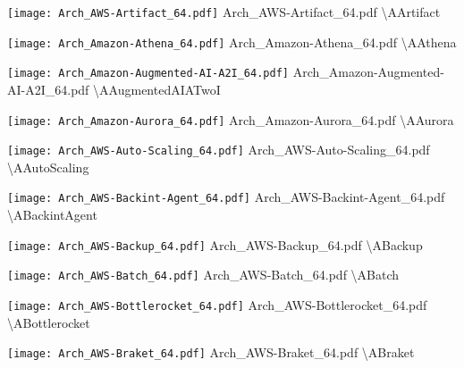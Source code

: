  {\texttt{[image: Arch\_AWS-Artifact\_64.pdf]}} {Arch\_AWS-Artifact\_64.pdf} {{\textbackslash}AArtifact}

 {\texttt{[image: Arch\_Amazon-Athena\_64.pdf]}} {Arch\_Amazon-Athena\_64.pdf} {{\textbackslash}AAthena}

 {\texttt{[image: Arch\_Amazon-Augmented-AI-A2I\_64.pdf]}} {Arch\_Amazon-Augmented-AI-A2I\_64.pdf} {{\textbackslash}AAugmentedAIATwoI}

 {\texttt{[image: Arch\_Amazon-Aurora\_64.pdf]}} {Arch\_Amazon-Aurora\_64.pdf} {{\textbackslash}AAurora}

 {\texttt{[image: Arch\_AWS-Auto-Scaling\_64.pdf]}} {Arch\_AWS-Auto-Scaling\_64.pdf} {{\textbackslash}AAutoScaling}

 {\texttt{[image: Arch\_AWS-Backint-Agent\_64.pdf]}} {Arch\_AWS-Backint-Agent\_64.pdf} {{\textbackslash}ABackintAgent}

 {\texttt{[image: Arch\_AWS-Backup\_64.pdf]}} {Arch\_AWS-Backup\_64.pdf} {{\textbackslash}ABackup}

 {\texttt{[image: Arch\_AWS-Batch\_64.pdf]}} {Arch\_AWS-Batch\_64.pdf} {{\textbackslash}ABatch}

 {\texttt{[image: Arch\_AWS-Bottlerocket\_64.pdf]}} {Arch\_AWS-Bottlerocket\_64.pdf} {{\textbackslash}ABottlerocket}

 {\texttt{[image: Arch\_AWS-Braket\_64.pdf]}} {Arch\_AWS-Braket\_64.pdf} {{\textbackslash}ABraket}

